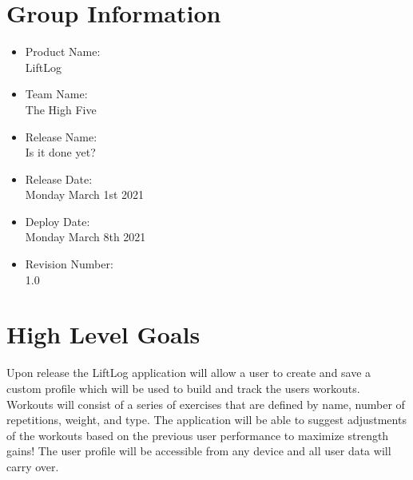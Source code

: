 \documentclass[12pt,letterpaper]{article}
\begin{document}
	\section*{Group Information}
		\begin{itemize}
			\item Product Name:\\
				LiftLog
			\item Team Name:\\
				The High Five
			\item Release Name:\\
				Is it done yet?
			\item Release Date:\\
				Monday March 1st 2021
			\item Deploy Date:\\
				Monday March 8th 2021
			\item Revision Number:\\
				1.0
		\end{itemize}
	\section{High Level Goals}
		Upon release the LiftLog application will allow a user to create and save a custom profile which will be used to build and track the users workouts. Workouts will consist of a series of exercises that are defined by name, number of repetitions, weight, and type. The application will be able to suggest adjustments of the workouts based on the previous user performance to maximize strength gains! The user profile will be accessible from any device and all user data will carry over.
\end{document}

